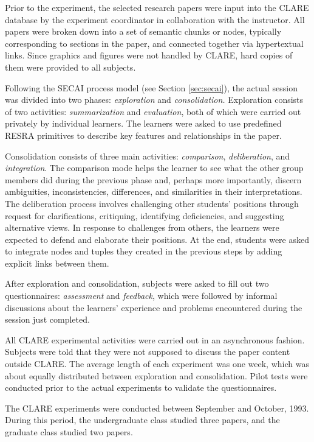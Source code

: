 Prior to the experiment, the selected research papers were input into the
CLARE database by the experiment coordinator in collaboration with the
instructor. All papers were broken down into a set of semantic chunks or
nodes, typically corresponding to sections in the paper, and connected
together via hypertextual links. Since graphics and figures were not
handled by CLARE, hard copies of them were provided to all subjects.

Following the SECAI process model (see Section \ref{sec:secai}), the actual
session was divided into two phases: {\it exploration\/} and {\it
consolidation.\/} Exploration consists of two activities: {\it
summarization\/} and {\it evaluation\/}, both of which were carried out
privately by individual learners. The learners were asked to use
predefined RESRA primitives to describe key features and relationships in
the paper.

Consolidation consists of three main activities: {\it comparison\/}, {\it
deliberation\/}, and {\it integration\/}. The comparison mode helps the
learner to see what the other group members did during the previous phase
and, perhaps more importantly, discern ambiguities, inconsistencies,
differences, and similarities in their interpretations. The deliberation
process involves challenging other students' positions through request for
clarifications, critiquing, identifying deficiencies, and suggesting
alternative views. In response to challenges from others, the learners were
expected to defend and elaborate their positions. At the end, students were
asked to integrate nodes and tuples they created in the previous steps by
adding explicit links between them.

After exploration and consolidation, subjects were asked to fill out two
questionnaires: {\it assessment\/} and {\it feedback\/}, which were
followed by informal discussions about the learners' experience and problems
encountered during the session just completed.

All CLARE experimental activities were carried out in an asynchronous
fashion. Subjects were told that they were not supposed to discuss the
paper content outside CLARE. The average length of each experiment was one
week, which was about equally distributed between exploration and
consolidation. Pilot tests were conducted prior to the actual experiments
to validate the questionnaires.

The CLARE experiments were conducted between September and October, 1993.
During this period, the undergraduate class studied three papers, and the
graduate class studied two papers.


